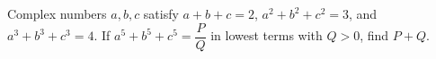 Complex numbers $a,b,c$ satisfy $a+b+c=2$, $a^2+b^2+c^2=3$, and $a^3+b^3+c^3=4$. If $a^5+b^5+c^5=\dfrac{P}{Q}$ in lowest terms with $Q>0$, find $P+Q$.
